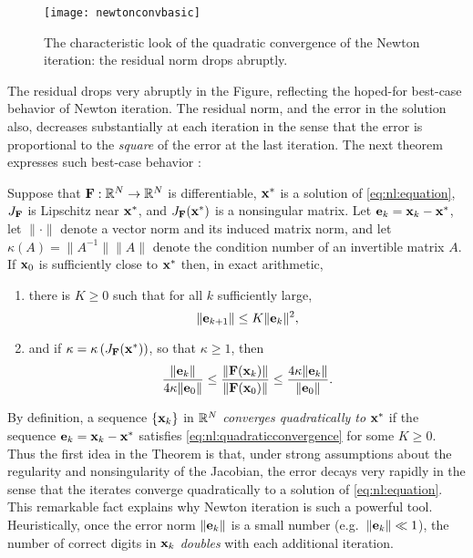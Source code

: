 \begin{figure}
\texttt{[image: newtonconvbasic]}
\caption{The characteristic look of the quadratic convergence of the Newton iteration: the residual norm drops abruptly.}
\label{fig:newtonconvbasic}
\end{figure}

The residual drops very abruptly in the Figure, reflecting the hoped-for best-case behavior of Newton iteration.  The residual norm, and the error in the solution also, decreases substantially at each iteration in the sense that the error is proportional to the \emph{square} of the error at the last iteration.  The next theorem expresses such best-case behavior \citep[Theorems 1.1 and inequalities (1.13)]{Kelley2003}:

\begin{theorem}
Suppose that $\mathbf{F}:\mathbb{R}^N\to\mathbb{R}^N$ is differentiable, $\mathbf{x}^*$ is a solution of \eqref{eq:nl:equation}, $J_{\mathbf{F}}$ is Lipschitz near $\mathbf{x}^*$, and $J_{\mathbf{F}}(\mathbf{x}^*)$ is a nonsingular matrix.  Let $\mathbf{e}_k=\mathbf{x}_k-\mathbf{x}^*$, let $\|\cdot\|$ denote a vector norm and its induced matrix norm, and let $\kappa(A)=\|A^{-1}\| \|A\|$ denote the condition number of an invertible matrix $A$.  If $\mathbf{x}_0$ is sufficiently close to $\mathbf{x}^*$ then, in exact arithmetic,
\renewcommand{\labelenumi}{(\roman{enumi})}
\begin{enumerate}
\item there is $K\ge 0$ such that for all $k$ sufficiently large,
\begin{equation}
	\|\mathbf{e}_{k+1}\| \le K \|\mathbf{e}_k\|^2, \label{eq:nl:quadraticconvergence}
\end{equation}
\item and if $\kappa = \kappa\left(J_{\mathbf{F}}(\mathbf{x}^*)\right)$, so that $\kappa\ge 1$, then
\begin{equation}
	\frac{\|\mathbf{e}_k\|}{4 \kappa \|\mathbf{e}_0\|} \le \frac{\|\mathbf{F}(\mathbf{x}_k)\|}{\|\mathbf{F}(\mathbf{x}_0)\|} \le \frac{4 \kappa \|\mathbf{e}_k\|}{\|\mathbf{e}_0\|}. \label{eq:nl:errorresidualnormequiv}
\end{equation}
\end{enumerate}
\end{theorem}

\medskip
By definition, a sequence $\{\mathbf{x}_k\}$ in $\mathbb{R}^N$ \emph{converges quadratically to} $\mathbf{x}^*$ if the sequence $\mathbf{e}_k=\mathbf{x}_k-\mathbf{x}^*$ satisfies \eqref{eq:nl:quadraticconvergence} for some $K\ge 0$.  Thus the first idea in the Theorem is that, under strong assumptions about the regularity and nonsingularity of the Jacobian, the error decays very rapidly in the sense that the iterates converge quadratically to a solution of \eqref{eq:nl:equation}.  This remarkable fact explains why Newton iteration is such a powerful tool.  Heuristically, once the error norm $\|\mathbf{e}_k\|$ is a small number (e.g.~$\|\mathbf{e}_k\| \ll 1$), the number of correct digits in $\mathbf{x}_k$ \emph{doubles} with each additional iteration.

